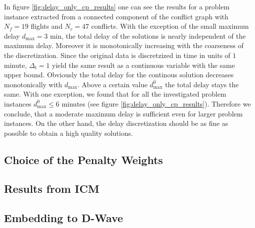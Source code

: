 \documentclass[aps,pra,twocolumn,10pt]{revtex4-1}
\begin{document}
In figure \ref{fig:delay_only_cp_results} one can see the results for a problem instance extracted from a connected component of the conflict graph with $N_f=19$ flights and $N_c=47$ conflicts.
With the exception of the small maximum delay $d_\text{max} = 3$ min, the total delay of the solutions is nearly independent of the maximum delay.
Moreover it is monotonically increasing with the coarseness of the discretization.
Since the original data is discretzized in time in units of $1$ minute, $\Delta_t=1$ yield the same result as a continuous variable with the same upper bound.
Obviously the total delay for the continous solution decreases monotonically with $d_\text{max}$.
Above a certain value $d^0_\text{max}$ the total delay stays the same.
With one exception, we found that for all the investigated problem instances $d^0_\text{max}\leq6$ minutes (see figure \ref{fig:delay_only_cp_results}).
Therefore we conclude, that a moderate maximum delay is sufficient even for larger problem instances.
On the other hand, the delay discretization should be as fine as possible to obtain a high quality solutions.
\subsection{Choice of the Penalty Weights}
\subsection{Results from ICM}
\subsection{Embedding to D-Wave}
\end{document}
